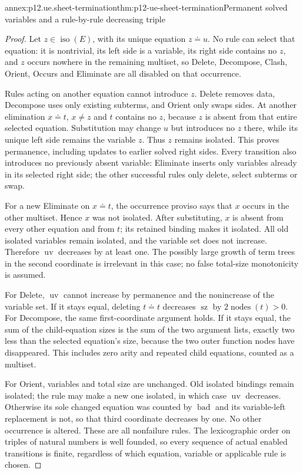 \begin{annexitem}{annex:p12.ue.sheet-termination}{thm:p12-ue-sheet-termination}{Permanent solved variables and a rule-by-rule decreasing triple}
\begin{proof}
Let \(z\in\operatorname{iso}(E)\), with its unique equation
\(z\doteq u\). No rule can select that equation: it is nontrivial,
its left side is a variable, its right side contains no \(z\), and
\(z\) occurs nowhere in the remaining multiset, so Delete, Decompose,
Clash, Orient, Occurs and Eliminate are all disabled on that occurrence.

Rules acting on another equation cannot introduce \(z\).
Delete removes data, Decompose uses only existing subterms, and Orient
only swaps sides. At another elimination \(x\doteq t\),
\(x\ne z\) and \(t\) contains no \(z\), because \(z\) is absent
from that entire selected equation. Substitution may change \(u\)
but introduces no \(z\) there, while its unique left side remains
the variable \(z\). Thus \(z\) remains isolated. This proves
permanence, including updates to earlier solved right sides.
Every transition also introduces no previously absent variable:
Eliminate inserts only variables already in its selected right side;
the other successful rules only delete, select subterms or swap.

For a new Eliminate on \(x\doteq t\), the occurrence proviso says
that \(x\) occurs in the other multiset. Hence \(x\) was not isolated.
After substituting, \(x\) is absent from every other equation and
from \(t\); its retained binding makes it isolated. All old isolated
variables remain isolated, and the variable set does not increase.
Therefore \(\operatorname{uv}\) decreases by at least one. The
possibly large growth of term trees in the second coordinate is irrelevant
in this case; no false total-size monotonicity is assumed.

For Delete, \(\operatorname{uv}\) cannot increase by permanence and
the nonincrease of the variable set. If it stays equal, deleting
\(t\doteq t\) decreases \(\operatorname{sz}\) by
\(2\operatorname{nodes}(t)>0\).
For Decompose, the same first-coordinate argument holds. If it stays
equal, the sum of the child-equation sizes is the sum of the two
argument lists, exactly two less than the selected equation's size,
because the two outer function nodes have disappeared. This includes
zero arity and repeated child equations, counted as a multiset.

For Orient, variables and total size are unchanged. Old isolated
bindings remain isolated; the rule may make a new one isolated, in
which case \(\operatorname{uv}\) decreases. Otherwise its sole
changed equation was counted by \(\operatorname{bad}\) and its
variable-left replacement is not, so that third coordinate decreases
by one. No other occurrence is altered. These are all nonfailure rules.
The lexicographic order on triples of natural numbers is well founded,
so every sequence of actual enabled transitions is finite, regardless
of which equation, variable or applicable rule is chosen.
\end{proof}
\end{annexitem}

